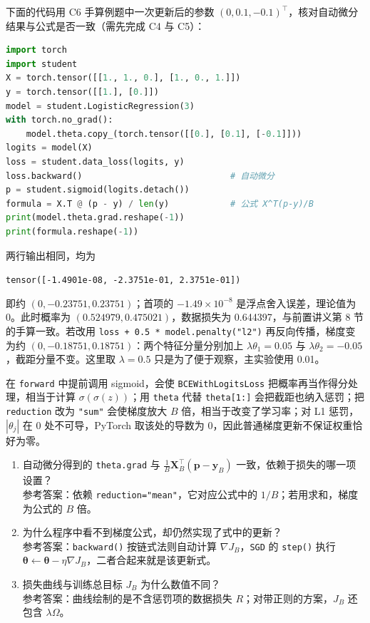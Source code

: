 \documentclass[UTF8,a4paper,11pt,fontset=fandol]{ctexart}
\begin{document}
下面的代码用 C6 手算例题中一次更新后的参数 $(0,0.1,-0.1)^\top$，核对自动微分结果与公式是否一致（需先完成 C4 与 C5）：
\begin{lstlisting}[language=Python]
import torch
import student
X = torch.tensor([[1., 1., 0.], [1., 0., 1.]])
y = torch.tensor([[1.], [0.]])
model = student.LogisticRegression(3)
with torch.no_grad():
    model.theta.copy_(torch.tensor([[0.], [0.1], [-0.1]]))
logits = model(X)
loss = student.data_loss(logits, y)
loss.backward()                             # 自动微分
p = student.sigmoid(logits.detach())
formula = X.T @ (p - y) / len(y)            # 公式 X^T(p-y)/B
print(model.theta.grad.reshape(-1))
print(formula.reshape(-1))
\end{lstlisting}
\begin{examplebox}[预期输出与解释]
两行输出相同，均为
\par{\centering\texttt{tensor([-1.4901e-08, -2.3751e-01, 2.3751e-01])}\par}
\noindent 即约 $(0,-0.23751,0.23751)$；首项的 $-1.49\times10^{-8}$ 是浮点舍入误差，理论值为 0。此时概率为 $(0.524979,0.475021)$，数据损失为 0.644397，与前置讲义第 8 节的手算一致。若改用 \texttt{loss + 0.5 * model.penalty("l2")} 再反向传播，梯度变为约 $(0,-0.18751,0.18751)$：两个特征分量分别加上 $\lambda\theta_1=0.05$ 与 $\lambda\theta_2=-0.05$，截距分量不变。这里取 $\lambda=0.5$ 只是为了便于观察，主实验使用 0.01。
\end{examplebox}
\begin{pitfallbox}[公式与代码的常见错位]
在 \texttt{forward} 中提前调用 sigmoid，会使 \texttt{BCEWithLogitsLoss} 把概率再当作得分处理，相当于计算 $\sigma(\sigma(z))$；用 \texttt{theta} 代替 \texttt{theta[1:]} 会把截距也纳入惩罚；把 \texttt{reduction} 改为 \texttt{"sum"} 会使梯度放大 $B$ 倍，相当于改变了学习率；对 L1 惩罚，$|\theta_j|$ 在 0 处不可导，PyTorch 取该处的导数为 0，因此普通梯度更新不保证权重恰好为零。
\end{pitfallbox}
\begin{questionbox}[对照检查与参考答案]
\begin{enumerate}
\item 自动微分得到的 \texttt{theta.grad} 与 $\frac1B\mathbf X_B^\top(\mathbf p-\mathbf y_B)$ 一致，依赖于损失的哪一项设置？\\
参考答案：依赖 \texttt{reduction="mean"}，它对应公式中的 $1/B$；若用求和，梯度为公式的 $B$ 倍。
\item 为什么程序中看不到梯度公式，却仍然实现了式中的更新？\\
参考答案：\texttt{backward()} 按链式法则自动计算 $\nabla J_B$，\texttt{SGD} 的 \texttt{step()} 执行 $\boldsymbol\theta\leftarrow\boldsymbol\theta-\eta\nabla J_B$，二者合起来就是该更新式。
\item 损失曲线与训练总目标 $J_B$ 为什么数值不同？\\
参考答案：曲线绘制的是不含惩罚项的数据损失 $R$；对带正则的方案，$J_B$ 还包含 $\lambda\Omega$。
\end{enumerate}
\end{questionbox}
\end{document}
